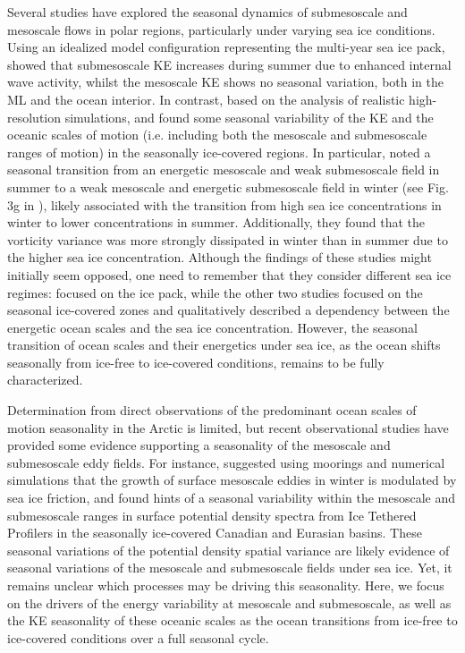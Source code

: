 \documentclass[draft]{agujournal2019}
\begin{document}
Several studies have explored the seasonal dynamics of submesoscale and mesoscale flows in polar regions, particularly under varying sea ice conditions. Using an idealized model configuration representing the multi-year sea ice pack, \citet{Mensa_seasonal_2017} showed that submesoscale KE increases during summer due to enhanced internal wave activity, whilst the mesoscale KE shows no seasonal variation, both in the ML and the ocean interior. 
In contrast, based on the analysis of realistic high-resolution simulations, \citet{Manucharyan_eddies_2022} and \citet{Liu_seasonal_2024} found some seasonal variability of the KE and the oceanic scales of motion (i.e. including both the mesoscale and submesoscale ranges of motion) in the seasonally ice-covered regions. In particular, \citet{Manucharyan_eddies_2022} noted a seasonal transition from an energetic mesoscale and weak submesoscale field in summer to a weak mesoscale and energetic submesoscale field in winter (see Fig. 3g in \citealt{Manucharyan_eddies_2022}), likely associated with the transition from high sea ice concentrations in winter to lower concentrations in summer. Additionally, they found that the vorticity variance was more strongly dissipated in winter than in summer due to the higher sea ice concentration. Although the findings of these studies might initially seem opposed, one need to remember that they consider different sea ice regimes: \citet{Mensa_seasonal_2017} focused on the ice pack, while the other two studies focused on the seasonal ice-covered zones and qualitatively described a dependency between the energetic ocean scales and the sea ice concentration. However, the seasonal transition of ocean scales and their energetics under sea ice, as the ocean shifts seasonally from ice-free to ice-covered conditions, remains to be fully characterized.

Determination from direct observations of the predominant ocean scales of motion seasonality in the Arctic is limited, but recent observational studies have provided some evidence supporting a seasonality of the mesoscale and submesoscale eddy fields. For instance, \citet{Meneghello_seasonal_2021} suggested using moorings and numerical simulations that the growth of surface mesoscale eddies in winter is modulated by sea ice friction, and \citet{Cassianides_eddies_2023} found hints of a seasonal variability within the mesoscale and submesoscale ranges in surface potential density spectra from Ice Tethered Profilers in the seasonally ice-covered Canadian and Eurasian basins. These seasonal variations of the potential density spatial variance are likely evidence of seasonal variations of the mesoscale and submesoscale fields under sea ice. Yet, it remains unclear which processes may be driving this seasonality. Here, we focus on the drivers of the energy variability at mesoscale and submesoscale, as well as the KE seasonality of these oceanic scales as the ocean transitions from ice-free to ice-covered conditions over a full seasonal cycle.
\end{document}
